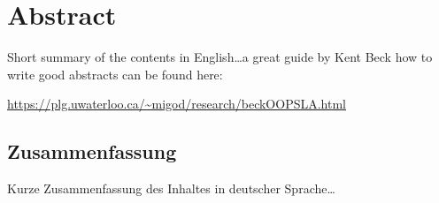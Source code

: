 \begingroup
\let\clearpage\relax
\let\cleardoublepage\relax
\let\cleardoublepage\relax

\chapter*{Abstract}
Short summary of the contents in English\dots a great guide by 
Kent Beck how to write good abstracts can be found here:  
\begin{center}
\url{https://plg.uwaterloo.ca/~migod/research/beckOOPSLA.html}
\end{center}

\vfill

\begin{otherlanguage}{ngerman}
\chapter*{Zusammenfassung}
Kurze Zusammenfassung des Inhaltes in deutscher Sprache\dots 
\end{otherlanguage}

\endgroup			

\vfill
